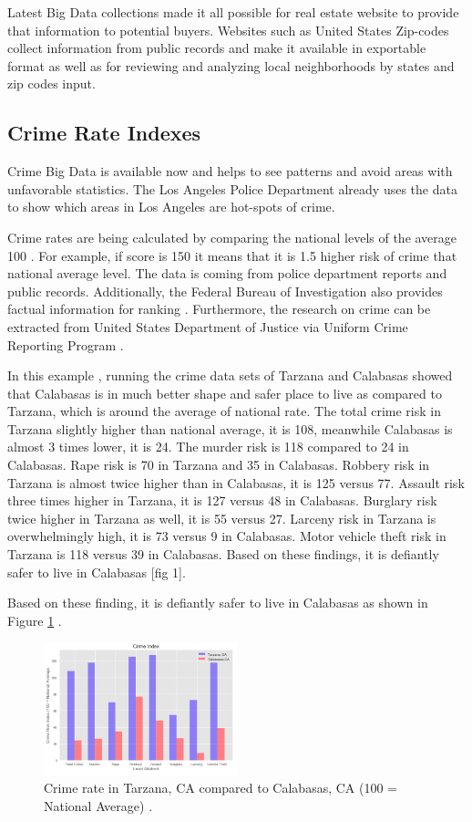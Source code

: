 \documentclass[sigconf]{acmart}
\begin{document}
Latest Big Data collections made it all possible for real estate website to provide that information to potential buyers. Websites such as United States Zip-codes \cite{zipcodes} collect information from public records and make it available in exportable format as well as for reviewing and analyzing local neighborhoods by states and zip codes input. 

\subsection{Crime Rate Indexes}

Crime Big Data is available now and helps to see patterns and avoid areas with unfavorable statistics. The Los Angeles Police Department \cite{federal} already uses the data to show which areas in Los Angeles are hot-spots of crime.

Crime rates are being calculated by comparing the national levels of the average 100 \cite{crime}. For example, if score is 150 it means that it is 1.5 higher risk of crime that national average level. The data is coming from police department reports and public records. Additionally, the Federal Bureau of Investigation also provides factual information for ranking \cite{crime2}. Furthermore, the research on crime can be extracted from United States Department of Justice via Uniform Crime Reporting Program  \cite{unicrime}.

In this example \cite{md}, running the crime data sets of Tarzana and Calabasas showed that Calabasas is in much better shape and safer place to live as compared to Tarzana, which is around the average of national rate. The total crime risk in Tarzana slightly higher than national average, it is 108, meanwhile Calabasas is almost 3 times lower, it is 24. The murder risk is 118 compared to 24 in Calabasas. Rape risk is 70 in Tarzana and 35 in Calabasas. Robbery risk in Tarzana is almost twice higher than in Calabasas, it is 125 versus 77. Assault risk three times higher in Tarzana, it is 127 versus 48 in Calabasas. Burglary risk twice higher in Tarzana as well, it is 55 versus 27. Larceny risk in Tarzana is overwhelmingly high, it is 73 versus 9 in Calabasas. Motor vehicle theft risk in Tarzana is 118 versus 39 in Calabasas. Based on these findings, it is defiantly safer to live in Calabasas [fig 1].

Based on these finding, it is defiantly safer to live in Calabasas as shown in Figure \ref{fig:figure1} \cite{md}.

\begin{figure}
  \centering
  \includegraphics[width=0.5\textwidth]{images/figure1.png}
  \caption{Crime rate in Tarzana, CA compared to Calabasas, CA (100 = National Average) \cite{md}.} \label{fig:figure1} 
\end{figure}
\end{document}
